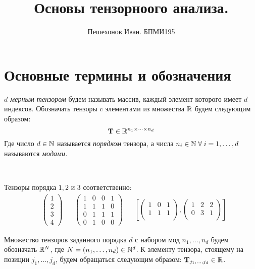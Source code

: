 \documentclass[a4paper, 12pt]{article}
\title{Основы тензорноого анализа.}
\author{Пешехонов Иван. БПМИ195}
\begin{document}
    \maketitle
    \pagestyle{empty}
    \tableofcontents
    \newpage
    \pagestyle{fancy}


    \section{Основные термины и обозначения}
    \begin{definition}
        \textit{$d$-мерным тензором} будем называть массив, каждый элемент которого имеет $d$ индексов. Обозначать тензоры c элементами из множества $\mathbb{R}$
        будем следующим образом:
        \[
            \mathbf{T} \in \mathbb{R}^{n_1 \times \cdots \times n_d}
        \]
        Где число $d \in \mathbb{N}$ называется \textit{порядком} тензора, а числа $n_i \in \mathbb{N} \; \forall \; i = 1,\ldots, d$ называются \it{модами}.
    \end{definition}\
    \begin{example}
        Тензоры порядка $1, 2$ и $3$ соответственно:
        \begin{align*}
            &\begin{pmatrix}
                 1\\2\\3\\4
            \end{pmatrix}
            &&\begin{pmatrix}
                  1 & 0 & 0 & 1\\
                  1 & 1 & 1 & 0\\
                  0 & 1 & 1 & 1\\
                  0 & 1 & 0 & 0
            \end{pmatrix}
            &&
            \left[
            \begin{pmatrix}
                1 & 0 & 1\\
                1 & 1 & 1\\
            \end{pmatrix},
            \begin{pmatrix}
                1 & 2 & 2\\
                0 & 3 & 1\\
            \end{pmatrix}
            \right]
        \end{align*}
    \end{example}
    Множество тензоров заданного порядка $d$ с набором мод $n_1, \ldots, n_d$ будем обозначать $\mathbb{R}^N$, где $N = (n_1, \ldots, n_d) \in \mathbb{N}^d$.
    К элементу тензора, стоящему на позиции $j_1, \ldots, j_d$, будем обращаться следующим образом: $\mathbf{T}_{j_1, \ldots, j_d} \in \mathbb{R}$.
    \begin{comment}
        Ясно, что хранение тензора в таком виде требует $\O{\max_{i = 1,\ldots, d} n_i^d}$ памяти. Число элементов тензора растёт экспоненциально
        с ростом порядка, что может быть большой проблемой, т.к. как мы увидим дельше, различные операции над тензорами могут приводить к изменению порядка.
    \end{comment}
\end{document}
